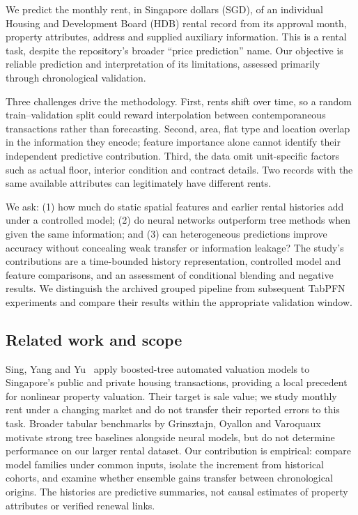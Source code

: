 \documentclass[conference]{IEEEtran}
\begin{document}
We predict the monthly rent, in Singapore dollars (SGD), of an individual Housing and Development Board (HDB) rental record from its approval month, property attributes, address and supplied auxiliary information. This is a rental task, despite the repository's broader ``price prediction'' name. Our objective is reliable prediction and interpretation of its limitations, assessed primarily through chronological validation.

Three challenges drive the methodology. First, rents shift over time, so a random train--validation split could reward interpolation between contemporaneous transactions rather than forecasting. Second, area, flat type and location overlap in the information they encode; feature importance alone cannot identify their independent predictive contribution. Third, the data omit unit-specific factors such as actual floor, interior condition and contract details. Two records with the same available attributes can legitimately have different rents.

We ask: (1) how much do static spatial features and earlier rental histories add under a controlled model; (2) do neural networks outperform tree methods when given the same information; and (3) can heterogeneous predictions improve accuracy without concealing weak transfer or information leakage? The study's contributions are a time-bounded history representation, controlled model and feature comparisons, and an assessment of conditional blending and negative results. We distinguish the archived grouped pipeline from subsequent TabPFN experiments and compare their results within the appropriate validation window.

\subsection{Related work and scope}
Sing, Yang and Yu~\cite{housing} apply boosted-tree automated valuation models to Singapore's public and private housing transactions, providing a local precedent for nonlinear property valuation. Their target is sale value; we study monthly rent under a changing market and do not transfer their reported errors to this task. Broader tabular benchmarks by Grinsztajn, Oyallon and Varoquaux~\cite{treebenchmark} motivate strong tree baselines alongside neural models, but do not determine performance on our larger rental dataset. Our contribution is empirical: compare model families under common inputs, isolate the increment from historical cohorts, and examine whether ensemble gains transfer between chronological origins. The histories are predictive summaries, not causal estimates of property attributes or verified renewal links.
\end{document}

